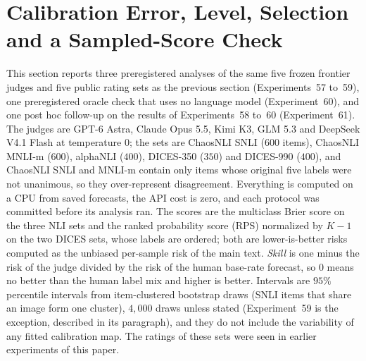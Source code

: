 
\section{Calibration Error, Level, Selection and a Sampled-Score Check}
\label{sec:supp-level-selection}

This section reports three preregistered analyses of the same five frozen frontier judges and five public rating sets as the previous section (Experiments~57 to~59), one preregistered oracle check that uses no language model (Experiment~60), and one post hoc follow-up on the results of Experiments~58 to~60 (Experiment~61).
The judges are GPT-6 Astra, Claude Opus 5.5, Kimi K3, GLM 5.3 and DeepSeek V4.1 Flash at temperature $0$; the sets are ChaosNLI SNLI ($600$ items), ChaosNLI MNLI-m ($600$), alphaNLI ($400$), DICES-350 ($350$) and DICES-990 ($400$), and ChaosNLI SNLI and MNLI-m contain only items whose original five labels were not unanimous, so they over-represent disagreement.
Everything is computed on a CPU from saved forecasts, the API cost is zero, and each protocol was committed before its analysis ran.
The scores are the multiclass Brier score on the three NLI sets and the ranked probability score (RPS) normalized by $K-1$ on the two DICES sets, whose labels are ordered; both are lower-is-better risks computed as the unbiased per-sample risk of the main text.
\emph{Skill} is one minus the risk of the judge divided by the risk of the human base-rate forecast, so $0$ means no better than the human label mix and higher is better.
Intervals are $95\%$ percentile intervals from item-clustered bootstrap draws (SNLI items that share an image form one cluster), $4{,}000$ draws unless stated (Experiment~59 is the exception, described in its paragraph), and they do not include the variability of any fitted calibration map.
The ratings of these sets were seen in earlier experiments of this paper.

